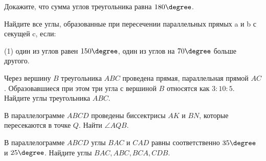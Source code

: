 %
%
%
\begin{class}[number=1]
	\begin{listofex}
		\item Докажите, что сумма углов треугольника равна \(180 \degree\).
		\item Найдите все углы, образованные при пересечении параллельных прямых a и b с секущей c, если:
		\begin{tasks}(1)
			\task один из углов равен \(150 \degree\),
			\task один из углов на \(70 \degree\) больше другого.
		\end{tasks}
		\item Через вершину \(B\) треугольника \(ABC\) проведена прямая, параллельная прямой \(AC\). Образовавшиеся при этом три угла с вершиной \(B\) относятся как \(3:10:5\). Найдите углы треугольника \(ABC\).
		\item В параллелограмме \(ABCD\) проведены биссектрисы \(AK\) и \(BN\), которые пересекаются в точке \(Q\). Найти \(\angle AQB\).
		\item В параллелограмме \(ABCD\) углы \(BAC\) и \(CAD\) равны соответственно \(35 \degree\) и \(25 \degree\). Найдите углы \(BAC, ABC, BCA, CDB\).
	\end{listofex}
\end{class}

\begin{class}[number=2]
	\begin{listofex}
		\item 
	\end{listofex}
\end{class}

\begin{homework}[number=1]
	\begin{listofex}
		\item 
	\end{listofex}
\end{homework}

\begin{class}[number=3]
	\begin{listofex}
		\item 
	\end{listofex}
\end{class}

